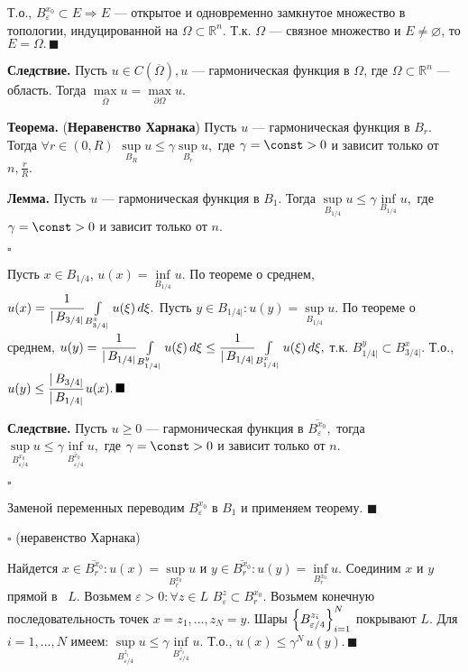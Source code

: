 \documentclass[12pt,a4paper,draft]{article}
\DeclareRobustCommand*{\т}{~--- }
\DeclareRobustCommand*{\ч}{~-- }
\begin{document}
Т.о., $B_{\varepsilon}^{x_0}\subset E\Rightarrow E$ --- открытое и
одновременно замкнутое множество в топологии, индуцированной на
$\Omega\subset \mathbb R^n.$ Т.к. $\Omega$ --- связное множество и
$E\ne\varnothing$, то $E=\Omega.\,\blacksquare$

\textbf{Следствие.} Пусть $u\in C(\overline{\Omega}), u$ ---
гармоническая функция в $\Omega$, где $\Omega\subset \mathbb R^n$
--- область. Тогда $\max\limits_{\overline{\Omega}}u=\max\limits_{\partial \Omega}u.$

\textbf{Теорема.} (\textbf{Неравенство Харнака}) Пусть $u$ ---
гармоническая функция в $B_r$. Тогда $\forall r\in (0,R) \,\,
\sup\limits_{B_R}u\le\gamma \sup\limits_{B_r}u,$ где
$\gamma=\const>0$ и зависит только от $n,\frac rR.$

\textbf{Лемма.} Пусть $u$ --- гармоническая функция в $B_1$. Тогда
$\sup\limits_{B_{1/4}}u\le\gamma \inf\limits_{B_{1/4}}u,$ где
$\gamma=\const>0$ и зависит только от $n.$

$\square$

Пусть $x\in B_{1/4},\, u(x)=\inf\limits_{B_{1/4}}u.$ По теореме о
среднем, $u(x)=\cfrac1{|\,B_{3/4|}}\int\limits_{B_{3/4|}^x}
u(\xi)\,d\xi.$ Пусть $y\in B_{1/4|}\colon
u(y)=\sup\limits_{B_{1/4}}u.$ По теореме о среднем,
$u(y)=\cfrac1{|\,B_{1/4|}}\int\limits_{B_{1/4|}^y} u(\xi)\,d\xi\le
\cfrac1{|\,B_{1/4|}}\int\limits_{B_{1/4|}^x} u(\xi)\,d\xi,$ т.к.
$B_{1/4|}^y\subset B_{3/4|}^x$. Т.о., $u(y)\le
\cfrac{|\,B_{3/4|}}{|\,B_{1/4|}}\,u(x).\,\blacksquare$

\textbf{Следствие.} Пусть $u\ge0$ --- гармоническая функция в
$\overline{B_{\varepsilon}^{x_0}},$ тогда
$\sup\limits_{B_{\varepsilon/4}^{x_0}}u\le\gamma
\inf\limits_{\overline{B_{\varepsilon/4}^{x_0}}}u,$ где
$\gamma=\const>0$ и зависит только от $n.$

$\square$

Заменой переменных переводим $B_{\varepsilon}^{x_0}$ в $B_1$ и
применяем теорему. $\blacksquare$

$\square$ (неравенство Харнака)

Найдется $x\in \overline{B_{r}^{x_0}}\colon
u(x)=\sup\limits_{B_{r}^{x_0}}u$ и $y\in
\overline{B_{r}^{x_0}}\colon u(y)=\inf\limits_{B_{r}^{x_0}}u.$
Соединим $x$ и $y$ прямой в~ $L$. Возьмем $\varepsilon>0\colon
\forall z\in L\,\, B_{\varepsilon}^{z}\subset B_{r}^{x_0}.$
Возьмем конечную последовательность точек $x=z_1,\ldots,z_N=y.$
Шары $\Bigl\{ B_{\varepsilon/4}^{z_i} \Bigr\}_{i=1}^N$ покрывают
$L$. Для $i=1,\ldots,N$ имеем:
$\sup\limits_{B_{\varepsilon/4}^{z_i}}u\le\gamma
\inf\limits_{B_{\varepsilon/4}^{z_i}}u.$ Т.о.,
$u(x)\le\gamma^N\,u(y).\,\blacksquare$
\end{document}
